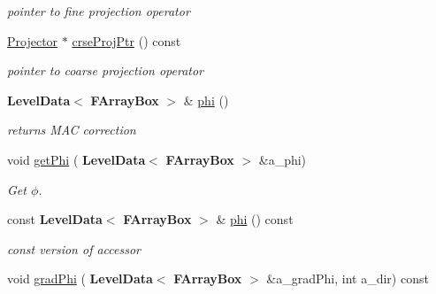 \begin{DoxyCompactItemize}
\begin{DoxyCompactList}\small\item\em pointer to fine projection operator \end{DoxyCompactList}\item 
\mbox{\label{class_projector_a288075033d467acad9d816b08ff7ad8a}} 
\hyperlink{class_projector}{Projector} $\ast$ \hyperlink{class_projector_a288075033d467acad9d816b08ff7ad8a}{crse\+Proj\+Ptr} () const
\begin{DoxyCompactList}\small\item\em pointer to coarse projection operator \end{DoxyCompactList}\item 
\mbox{\label{class_projector_a5b1dba855fe2bce8766a4e0e09f15dd0}} 
\textbf{ Level\+Data}$<$ \textbf{ F\+Array\+Box} $>$ \& \hyperlink{class_projector_a5b1dba855fe2bce8766a4e0e09f15dd0}{phi} ()
\begin{DoxyCompactList}\small\item\em returns M\+AC correction \end{DoxyCompactList}\item 
\mbox{\label{class_projector_a8ccfb169a91c1def065977e944cc1727}} 
void \hyperlink{class_projector_a8ccfb169a91c1def065977e944cc1727}{get\+Phi} (\textbf{ Level\+Data}$<$ \textbf{ F\+Array\+Box} $>$ \&a\+\_\+phi)
\begin{DoxyCompactList}\small\item\em Get $ \phi $. \end{DoxyCompactList}\item 
\mbox{\label{class_projector_ad5e4d77e887b9a05fc31369c105f8518}} 
const \textbf{ Level\+Data}$<$ \textbf{ F\+Array\+Box} $>$ \& \hyperlink{class_projector_ad5e4d77e887b9a05fc31369c105f8518}{phi} () const
\begin{DoxyCompactList}\small\item\em const version of accessor \end{DoxyCompactList}\item 
\mbox{\label{class_projector_a729e591ff64a078b5a4602447603f974}} 
void \hyperlink{class_projector_a729e591ff64a078b5a4602447603f974}{grad\+Phi} (\textbf{ Level\+Data}$<$ \textbf{ F\+Array\+Box} $>$ \&a\+\_\+grad\+Phi, int a\+\_\+dir) const

\end{DoxyCompactItemize}
